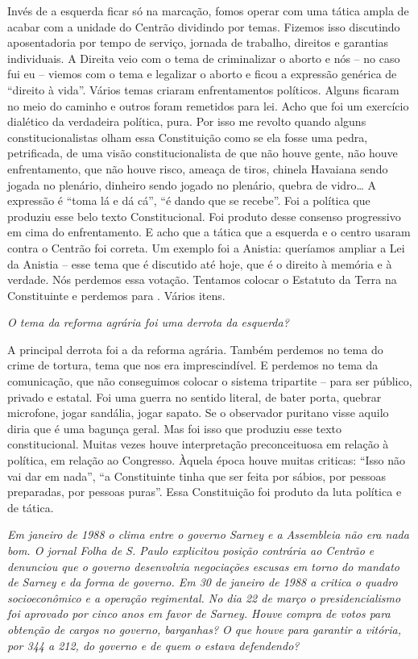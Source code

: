 Invés de a esquerda ficar só na marcação, fomos operar com uma tática
ampla de acabar com a unidade do Centrão dividindo por temas. Fizemos
isso discutindo aposentadoria por tempo de serviço, jornada de trabalho,
direitos e garantias individuais. A Direita veio com o tema de
criminalizar o aborto e nós -- no caso fui eu -- viemos com o tema e
legalizar o aborto e ficou a expressão genérica de ``direito à vida''.
Vários temas criaram enfrentamentos políticos. Alguns ficaram no meio do
caminho e outros foram remetidos para lei. Acho que foi um exercício
dialético da verdadeira política, pura. Por isso me revolto quando
alguns constitucionalistas olham essa Constituição como se ela fosse uma
pedra, petrificada, de uma visão constitucionalista de que não houve
gente, não houve enfrentamento, que não houve risco, ameaça de tiros,
chinela Havaiana sendo jogada no plenário, dinheiro sendo jogado no
plenário, quebra de vidro\ldots{} A expressão é ``toma lá e dá cá'', ``é
dando que se recebe''. Foi a política que produziu esse belo texto
Constitucional. Foi produto desse consenso progressivo em cima do
enfrentamento. E acho que a tática que a esquerda e o centro usaram
contra o Centrão foi correta. Um exemplo foi a Anistia: queríamos
ampliar a Lei da Anistia -- esse tema que é discutido até hoje, que é o
direito à memória e à verdade. Nós perdemos essa votação. Tentamos
colocar o Estatuto da Terra na Constituinte e perdemos para . Vários
itens.

\medskip

\noindent\emph{O tema da reforma agrária foi uma derrota da esquerda?}

A principal derrota foi a da reforma agrária. Também
perdemos no tema do crime de tortura, tema que nos era imprescindível. E
perdemos no tema da comunicação, que não conseguimos colocar o sistema
tripartite -- para ser público, privado e estatal. Foi uma guerra no
sentido literal, de bater porta, quebrar microfone, jogar sandália,
jogar sapato. Se o observador puritano visse aquilo diria que é uma
bagunça geral. Mas foi isso que produziu esse texto constitucional.
Muitas vezes houve interpretação preconceituosa em relação à política,
em relação ao Congresso. Àquela época houve muitas criticas: ``Isso não
vai dar em nada'', ``a Constituinte tinha que ser feita por sábios, por
pessoas preparadas, por pessoas puras''. Essa Constituição foi produto
da luta política e de tática.

\medskip

\noindent\emph{Em janeiro de 1988 o clima entre o governo Sarney e a Assembleia
não era nada bom. O jornal \emph{Folha de S. Paulo} explicitou posição
contrária ao Centrão e denunciou que o governo desenvolvia negociações
escusas em torno do mandato de Sarney e da forma de governo. Em 30 de
janeiro de 1988 a  critica o quadro socioeconômico e a operação
regimental. No dia 22 de março o presidencialismo foi aprovado por cinco
anos em favor de Sarney. Houve compra de votos para obtenção de cargos
no governo, barganhas? O que houve para garantir a vitória, por 344 a
212, do governo e de quem o estava defendendo?}

